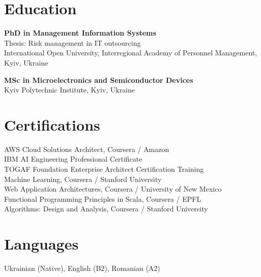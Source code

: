 \documentclass[10pt,a4paper]{article}
\begin{document}
\section*{Education}

\textbf{PhD in Management Information Systems} \\
Thesis: Risk management in IT outsourcing \\
International Open University, Interregional Academy of Personnel Management, Kyiv, Ukraine

\textbf{MSc in Microelectronics and Semiconductor Devices} \\
Kyiv Polytechnic Institute, Kyiv, Ukraine

\section*{Certifications}

AWS Cloud Solutions Architect, Coursera / Amazon \\
IBM AI Engineering Professional Certificate \\
TOGAF Foundation Enterprise Architect Certification Training \\
Machine Learning, Coursera / Stanford University \\
Web Application Architectures, Coursera / University of New Mexico \\
Functional Programming Principles in Scala, Coursera / EPFL \\
Algorithms: Design and Analysis, Coursera / Stanford University

\section*{Languages}

Ukrainian (Native), English (B2), Romanian (A2)
\end{document}
